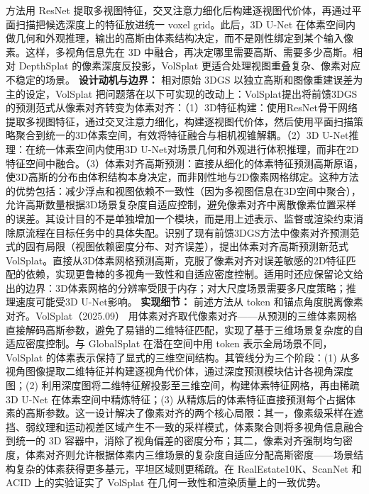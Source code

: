 方法用 ResNet 提取多视图特征，交叉注意力细化后构建逐视图代价体，再通过平面扫描把候选深度上的特征放进统一 voxel grid。此后，3D U-Net 在体素空间内做几何和外观推理，输出的高斯由体素结构决定，而不是刚性绑定到某个输入像素。这样，多视角信息先在 3D 中融合，再决定哪里需要高斯、需要多少高斯。相对 DepthSplat 的像素深度反投影，VolSplat 更适合处理视图重叠复杂、像素对应不稳定的场景。
\textbf{设计动机与边界：} 相对原始 3DGS 以独立高斯和图像重建误差为主的设定，VolSplat 把问题落在以下可实现的改动上：VolSplat提出将前馈3DGS的预测范式从像素对齐转变为体素对齐：（1）3D特征构建：使用ResNet骨干网络提取多视图特征，通过交叉注意力细化，构建逐视图代价体，然后使用平面扫描策略聚合到统一的3D体素空间，有效将特征融合与相机视锥解耦。（2）3D U-Net推理：在统一体素空间内使用3D U-Net对场景几何和外观进行体积推理，而非在2D特征空间中融合。（3）体素对齐高斯预测：直接从细化的体素特征预测高斯原语，使3D高斯的分布由体积结构本身决定，而非刚性地与2D像素网格绑定。这种方法的优势包括：减少浮点和视图依赖不一致性（因为多视图信息在3D空间中聚合），允许高斯数量根据3D场景复杂度自适应控制，避免像素对齐中离散像素位置采样的误差。其设计目的不是单独增加一个模块，而是用上述表示、监督或渲染约束消除原流程在目标任务中的具体失配。识别了现有前馈3DGS方法中像素对齐预测范式的固有局限（视图依赖密度分布、对齐误差），提出体素对齐高斯预测新范式VolSplat。直接从3D体素网格预测高斯，克服了像素对齐对误差敏感的2D特征匹配的依赖，实现更鲁棒的多视角一致性和自适应密度控制。适用时还应保留论文给出的边界：3D体素网格的分辨率受限于内存；对大尺度场景需要多尺度策略；推理速度可能受3D U-Net影响。
\textbf{实现细节：} 前述方法从 token 和锚点角度脱离像素对齐。VolSplat（2025.09） 用体素对齐取代像素对齐——从预测的三维体素网格直接解码高斯参数，避免了易错的二维特征匹配，实现了基于三维场景复杂度的自适应密度控制。与 GlobalSplat 在潜在空间中用 token 表示全局场景不同，VolSplat 的体素表示保持了显式的三维空间结构。其管线分为三个阶段：(1) 从多视角图像提取二维特征并构建逐视角代价体，通过深度预测模块估计各视角深度图；(2) 利用深度图将二维特征解投影至三维空间，构建体素特征网格，再由稀疏 3D U-Net 在体素空间中精炼特征；(3) 从精炼后的体素特征直接预测每个占据体素的高斯参数。这一设计解决了像素对齐的两个核心局限：其一，像素级采样在遮挡、弱纹理和运动视差区域产生不一致的采样模式，体素聚合则将多视角信息融合到统一的 3D 容器中，消除了视角偏差的密度分布；其二，像素对齐强制均匀密度，体素对齐则允许根据体素内三维场景的复杂度自适应分配高斯密度——场景结构复杂的体素获得更多基元，平坦区域则更稀疏。在 RealEstate10K、ScanNet 和 ACID 上的实验证实了 VolSplat 在几何一致性和渲染质量上的一致优势。
